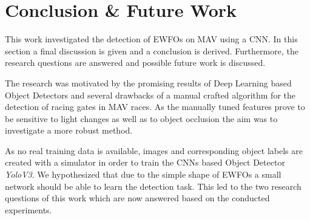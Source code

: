 \chapter{Conclusion \& Future Work}
\label{sec:conclusion}
This work investigated the detection of \acp{EWFO} on \ac{MAV} using a \ac{CNN}. In this section a final discussion is given and a conclusion is derived. Furthermore, the research questions are answered and possible future work is discussed.

The research was motivated by the promising results of Deep Learning based Object Detectors and several drawbacks of a manual crafted algorithm for the detection of racing gates in \ac{MAV} races. As the manually tuned features prove to be sensitive to light changes as well as to object occlusion the aim was to investigate a more robust method. 

As no real training data is available, images and corresponding object labels are created with a simulator in order to train the \acp{CNN} based Object Detector \textit{YoloV3}. We hypothesized that due to the simple shape of \acp{EWFO} a small network should be able to learn the detection task. This led to the two research questions of this work which are now answered based on the conducted experiments.

